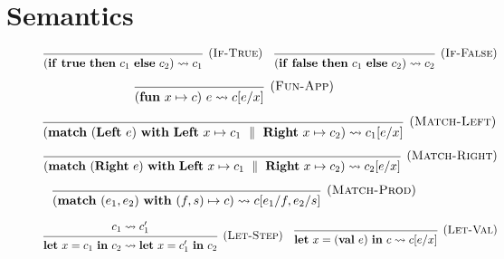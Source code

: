 \documentclass[class=article, crop=false]{standalone}
\renewcommand{\leadsto}{\rightsquigarrow}
\newcommand{\dmid}{\ \parallel \ }
\newcommand{\effFalse}{\mathbf{false}}
\newcommand{\effTrue}{\mathbf{true}}
\newcommand{\effLeft}{\mathbf{Left}\ }
\newcommand{\effRight}{\mathbf{Right\ }}
\newcommand{\effFun}{\mathbf{fun}\ }
\newcommand{\effVal}{\mathbf{val}\ }
\newcommand{\effWith}{\mathbf{with}\ }
\newcommand{\effIf}{\mathbf{if}\ }
\newcommand{\effThen}{\ \mathbf{then}\ }
\newcommand{\effElse}{\ \mathbf{else}\ }
\newcommand{\effMatch}{\mathbf{match}\ }
\newcommand{\effLet}{\mathbf{let}\ }
\newcommand{\effIn}{\ \mathbf{in}\ }
\begin{document}
\section{Semantics}
\label{sec:full-semantics}
\begin{figure}[H]
    $$
    \begin{prooftree}
    \hypo{}
    \infer1[(\textsc{If-True})]{\left( \effIf \effTrue \effThen c_1 \effElse c_2 \right) \leadsto c_1}
    \end{prooftree}
    \quad
    \begin{prooftree}
      \hypo{}
      \infer1[(\textsc{If-False})]{\left( \effIf \effFalse \effThen c_1 \effElse c_2 \right) \leadsto c_2}
    \end{prooftree}
    $$
    
    $$
    \begin{prooftree}
      \hypo{}
      \infer1[(\textsc{Fun-App})]{(\effFun x \mapsto c)\ e \leadsto c[e/x]}
    \end{prooftree}
    $$

    $$
    \begin{prooftree}
      \hypo{}
      \infer1[(\textsc{Match-Left})]{\left( \effMatch (\effLeft e)\ \effWith \effLeft x \mapsto c_1 \dmid \effRight x \mapsto c_2 \right)  \leadsto c_1[e/x]}
    \end{prooftree}
    $$
    
    $$
    \begin{prooftree}
      \hypo{}
      \infer1[(\textsc{Match-Right})]{\left( \effMatch (\effRight e)\ \effWith \effLeft x \mapsto c_1 \dmid \effRight x \mapsto c_2 \right)  \leadsto c_2[e/x]}
    \end{prooftree}
    $$
    
    $$
    \begin{prooftree}
      \hypo{}
      \infer1[(\textsc{Match-Prod})]{\left( \effMatch (e_1, e_2)\ \effWith (f,s) \mapsto c \right) \leadsto c[e_1/f, e_2/s]}
    \end{prooftree}
    $$
    
    $$
    \begin{prooftree}
      \hypo{c_1 \leadsto c_1'}
      \infer1[(\textsc{Let-Step})]{\effLet x = c_1 \effIn c_2 \leadsto \effLet x = c_1' \effIn c_2}
    \end{prooftree}
    \quad
    \begin{prooftree}
      \hypo{}
      \infer1[(\textsc{Let-Val})]{\effLet x = (\effVal e) \effIn c \leadsto c[e/x]}
    \end{prooftree}
    $$
    

\end{figure}
\end{document}
